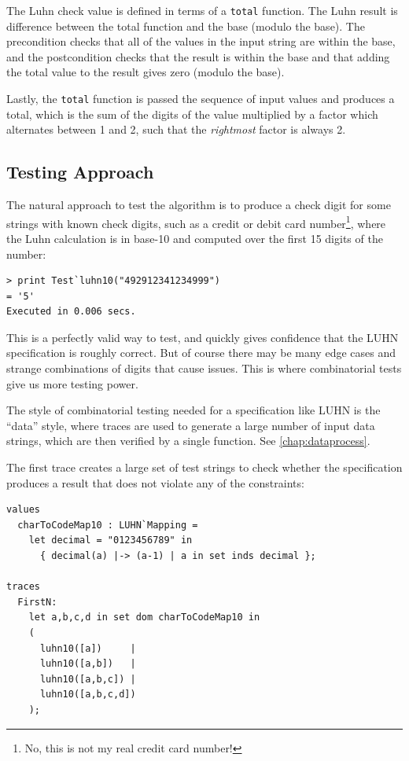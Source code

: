 \documentclass{overturerepchap}
\begin{document}
\noindent The Luhn check value is defined in terms of a \texttt{total} function. The
Luhn result is difference between the total function and the base (modulo the
base). The precondition checks that all of the values in the input string are
within the base, and the postcondition checks that the result is within the base
and that adding the total value to the result gives zero (modulo the base).

Lastly, the \texttt{total} function is passed the sequence of input values and
produces a total, which is the sum of the digits of the value multiplied by a
factor which alternates between 1 and 2, such that the \emph{rightmost}
factor is always 2.

\subsection{Testing Approach}

The natural approach to test the algorithm is to produce a check digit for some
strings with known check digits, such as a credit or debit card
number\footnote{No, this is not my real credit card number!}, where the Luhn
calculation is in base-10 and computed over the first 15 digits of the number:

\small
\begin{lstlisting}
> print Test`luhn10("492912341234999")
= '5'
Executed in 0.006 secs. 
\end{lstlisting}
\normalsize

\noindent This is a perfectly valid way to test, and quickly gives confidence that the
LUHN specification is roughly correct. But of course there may be many edge
cases and strange combinations of digits that cause issues. This is where
combinatorial tests give us more testing power.

The style of combinatorial testing needed for a specification like LUHN is the
``data'' style, where traces are used to generate a large number of input data
strings, which are then verified by a single function. See
\ref{chap:dataprocess}.

The first trace creates a large set of test strings to check whether the
specification produces a result that does not violate any of the constraints:

\small
\begin{lstlisting}
values
  charToCodeMap10 : LUHN`Mapping =
    let decimal = "0123456789" in
      { decimal(a) |-> (a-1) | a in set inds decimal };

traces
  FirstN:
    let a,b,c,d in set dom charToCodeMap10 in
    (
      luhn10([a])     |
      luhn10([a,b])   |
      luhn10([a,b,c]) |
      luhn10([a,b,c,d])
    );
\end{lstlisting}
\normalsize
\end{document}
